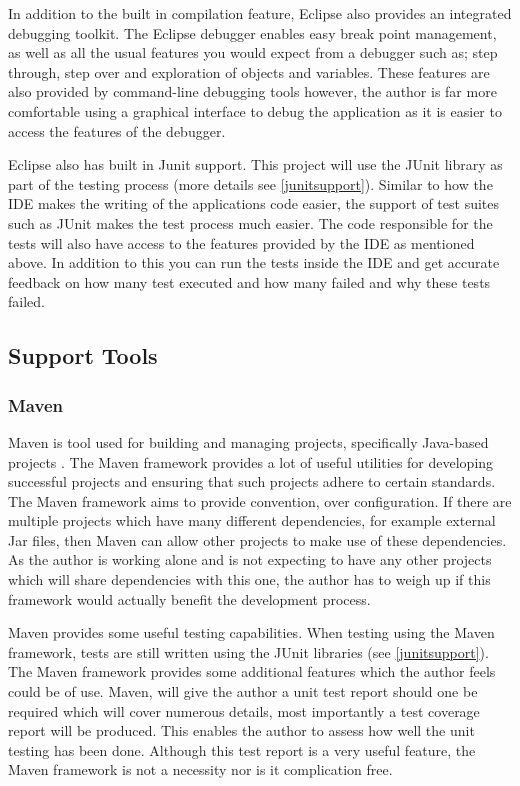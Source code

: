 In addition to the built in compilation feature, Eclipse also provides an integrated debugging toolkit. The Eclipse debugger enables easy break point management, as well as all the usual features you would expect from a debugger such as; step through, step over and exploration of objects and variables. These features are also provided by command-line debugging tools however, the author is far more comfortable using a graphical interface to debug the application as it is easier to access the features of the debugger.

Eclipse also has built in Junit support. This project will use the JUnit library as part of the testing process (more details see \ref{junitsupport}). Similar to how the IDE makes the writing of the applications code easier, the support of test suites such as JUnit makes the test process much easier. The code responsible for the tests will also have access to the features provided by the IDE as mentioned above. In addition to this you can run the tests inside the IDE and get accurate feedback on how many test executed and how many failed and why these tests failed.

\subsection{Support Tools}

\subsubsection{Maven}

Maven is tool used for building and managing projects, specifically Java-based projects \cite{maven:site}. The Maven framework provides a lot of useful utilities for developing successful projects and ensuring that such projects adhere to certain standards. The Maven framework aims to provide convention, over configuration. If there are multiple projects which have many different dependencies, for example external Jar files, then Maven can allow other projects to make use of these dependencies. As the author is working alone and is not expecting to have any other projects which will share dependencies with this one, the author has to weigh up if this framework would actually benefit the development process.

Maven provides some useful testing capabilities. When testing using the Maven framework, tests are still written using the JUnit libraries (see \ref{junitsupport}). The Maven framework provides some additional features which the author feels could be of use. Maven, will give the author a unit test report should one be required which will cover numerous details, most importantly a test coverage report will be produced. This enables the author to assess how well the unit testing has been done. Although this test report is a very useful feature, the Maven framework is not a necessity nor is it complication free.

